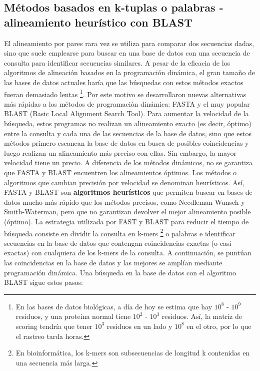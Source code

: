 \subsection{Métodos basados en k-tuplas o palabras - alineamiento heurístico con BLAST} 
El alineamiento por pares rara vez se utiliza para comparar dos secuencias dadas, sino que suele emplearse para buscar en una base de datos con una secuencia de consulta para identificar secuencias similares. A pesar de la eficacia de los algoritmos de alineación basados en la programación dinámica, el gran tamaño de las bases de datos actuales haría que las búsquedas con estos métodos exactos fueran demasiado lentas \footnote{En las bases de datos biológicas, a día de hoy se estima que hay $10^8$ - $10^9$ residuos, y una proteína normal tiene $10^2$ - $10^3$ residuos. Así, la matriz de scoring tendría que tener $10^3$ residuos en un lado y $10^8$ en el otro, por lo que el rastreo tarda horas.}. Por este motivo se desarrollaron nuevas alternativas más rápidas a los métodos de programación dinámica: FASTA y el muy popular BLAST (Basic Local Alignment Search Tool). Para aumentar la velocidad de la búsqueda, estos programas no realizan un alineamiento exacto (es decir, óptimo) entre la consulta y cada una de las secuencias de la base de datos, sino que estos métodos primero escanean la base de datos en busca de posibles coincidencias y luego realizan un alineamiento más preciso con ellas. Sin embargo, la mayor velocidad tiene un precio. A diferencia de los métodos dinámicos, no se garantiza que FASTA y BLAST encuentren los alineamientos óptimos. Los métodos o algoritmos que cambian precisión por velocidad se denominan heurísticos. Así, FASTA y BLAST son \textbf{algoritmos heurísticos} que permiten buscar en bases de datos mucho más rápido que los métodos precisos, como Needleman-Wunsch y Smith-Waterman, pero que no garantizan devolver el mejor alineamiento posible (óptimo). La estrategia utilizada por FAST y BLAST para reducir el tiempo de búsqueda consiste en dividir la consulta en k-mers \footnote{En bioinformática, los k-mers son subsecuencias de longitud k contenidas en una secuencia más larga.} o palabras e identificar secuencias en la base de datos que contengan coincidencias exactas (o casi exactas) con cualquiera de los k-mers de la consulta. A continuación, se puntúan las coincidencias en la base de datos y las mejores se amplían mediante programación dinámica.
Una búsqueda en la base de datos con el algoritmo BLAST sigue estos pasos:
